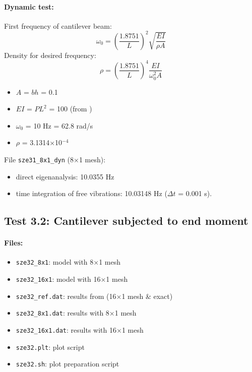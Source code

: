 \documentclass{article}
\newcommand{\mesh}[2]{#1$\times$#2}
\begin{document}
\paragraph{Dynamic test:}
First frequency of cantilever beam:
\begin{equation*}
	\omega_0
	=
	\left(\frac{1.8751}{L}\right)^2
	\sqrt{\frac{EI}{\rho A}}
\end{equation*}
Density for desired frequency:
\begin{equation*}
	\rho
	=
	\left(\frac{1.8751}{L}\right)^4
	\frac{EI}{\omega_0^2 A}
\end{equation*}
\begin{itemize}
\item $A$ = $bh$ = 0.1
\item $EI$ = $P L^2$ = 100 (from \cite{SZE-2004})
\item $\omega_0$ = 10 Hz = 62.8 rad/s
\item $\rho$ = 3.1314$\times$10$^{-4}$
\end{itemize}
File \verb!sze31_8x1_dyn! (\mesh{8}{1} mesh):
\begin{itemize}
\item direct eigenanalysis: 10.0355 Hz
\item time integration of free vibrations: 10.03148 Hz ($\Delta t$ = 0.001 s).
\end{itemize}



\subsection{Test 3.2: Cantilever subjected to end moment}

\paragraph{Files:}
\begin{itemize}
\item \verb!sze32_8x1!: model with \mesh{8}{1} mesh
\item \verb!sze32_16x1!: model with \mesh{16}{1} mesh
\item \verb!sze32_ref.dat!: results from \cite{SZE-2004} (\mesh{16}{1} mesh \& exact)
\item \verb!sze32_8x1.dat!: results with \mesh{8}{1} mesh
\item \verb!sze32_16x1.dat!: results with \mesh{16}{1} mesh
\item \verb!sze32.plt!: plot script
\item \verb!sze32.sh!: plot preparation script
\end{itemize}
\end{document}
